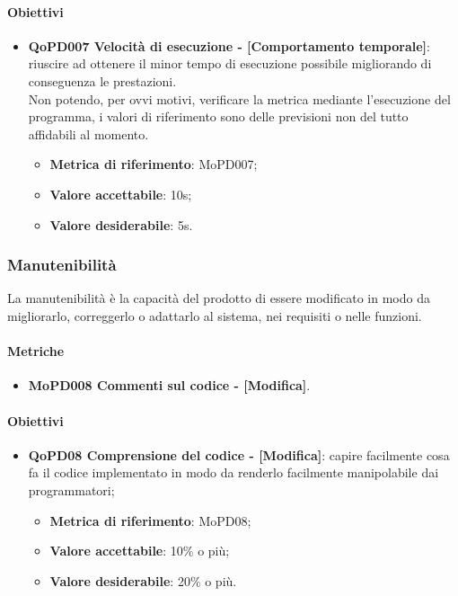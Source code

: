 \documentclass[../piano-di-qualifica.tex]{subfiles}
\begin{document}
\paragraph{Obiettivi}
\label{sub:obiettivi}
\begin{itemize}
    \item \textbf{QoPD007 Velocità di esecuzione - [Comportamento temporale]}: riuscire ad ottenere il minor tempo di esecuzione possibile migliorando di conseguenza le prestazioni.
    \\ Non potendo, per ovvi motivi, verificare la metrica mediante l'esecuzione del programma, i valori di riferimento sono delle previsioni non del tutto affidabili al momento.
        \begin{itemize}
            \item \textbf{Metrica di riferimento}: MoPD007;
            \item \textbf{Valore accettabile}: 10s;
            \item \textbf{Valore desiderabile}: 5s.
        \end{itemize}
\end{itemize}

\subsubsection{Manutenibilità}%
\label{sub:manutenibilita}
La manutenibilità è la capacità del prodotto di essere modificato in modo da migliorarlo, correggerlo o adattarlo al sistema, nei requisiti o nelle funzioni.

\paragraph{Metriche}
\label{sub:metriche}
\begin{itemize}
    \item \textbf{MoPD008 Commenti sul codice - [Modifica]}.
\end{itemize}

\paragraph{Obiettivi}
\label{sub:obiettivi}
\begin{itemize}
    \item \textbf{QoPD08 Comprensione del codice - [Modifica]}: capire facilmente cosa fa il codice implementato in modo da renderlo facilmente manipolabile dai programmatori;
        \begin{itemize}
            \item \textbf{Metrica di riferimento}: MoPD08;
            \item \textbf{Valore accettabile}: 10\% o più;
            \item \textbf{Valore desiderabile}: 20\% o più.
        \end{itemize}
\end{itemize}
\end{document}
